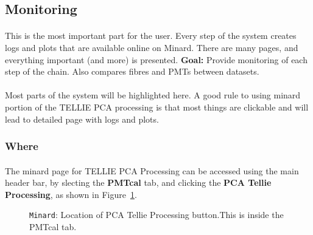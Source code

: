 \documentclass[12pt]{article}
\begin{document}
\subsection{Monitoring}\label{sec:monitor}
\paragraph{}
This is the most important part for the user. Every step of the system creates logs and plots that are available online on Minard. There are many pages, and everything important (and more) is presented. 
\textbf{Goal:} Provide monitoring of each step of the chain. Also compares fibres and PMTs between datasets.

\paragraph{}
Most parts of the system will be highlighted here. A good rule to using minard portion of the TELLIE PCA processing is that most things are clickable and will lead to detailed page with logs and plots.

\subsubsection{Where}
\paragraph{}
The minard page for TELLIE PCA Processing can be accessed using the main header bar, by slecting the \textbf{PMTcal} tab, and clicking the \textbf{PCA Tellie Processing}, as shown in Figure~\ref{fig:min1}.

\begin{figure}
\centering
\noindent{}
  \caption{\centering \texttt{Minard}: Location of PCA Tellie Processing button.\hspace{\textwidth}This is inside the PMTcal tab.}
  \label{fig:min1}
\end{figure}
\end{document}
